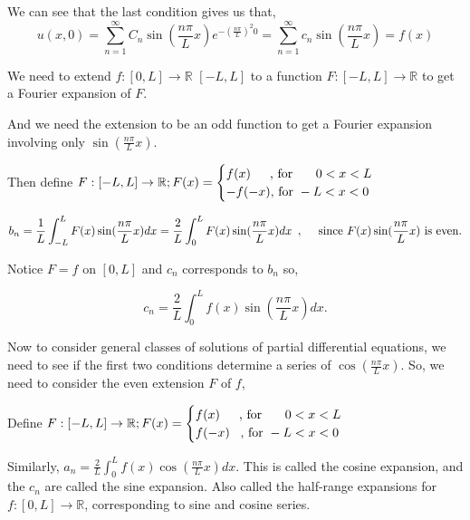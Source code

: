 \documentclass{article}
\newcommand\R{\mathbb{R}}
\begin{document}
We can see that the last condition gives us that,
$$u(x,0) = \sum_{n=1}^\infty C_n
\sin(\frac{n\pi}{L}x)e^{-(\frac{n\pi}{L})^2 0} = \sum_{n=1}^\infty c_n
\sin(\frac{n\pi}{L}x) = f(x)$$

We need to extend $f:[0,L]\rightarrow \R$
$[-L,L]$ to a function $F:[-L,L]\rightarrow \R$ to get a Fourier expansion of $F$.

And we need the extension to be an odd function to get a Fourier expansion involving only
$\sin(\frac{n\pi}{L}x)$.

Then define $F:[-L,L]\rightarrow \R; F(x) = \begin{cases} f(x)\quad\enskip \text{, for
  }\quad\enskip 0<x<L\\ -f(-x)\text{, for }-L<x<0\end{cases}$

$$b_n = \frac{1}{L}\int_{-L}^L F(x)\sin(\frac{n\pi}{L}x)dx =
\frac{2}{L}\int_{0}^LF(x)\sin(\frac{n\pi}{L}x)dx\enskip,\quad \text{ since
}F(x)\sin(\frac{n\pi}{L}x)\text{ is even.}$$

Notice $F = f$ on $[0,L]$ and $c_n$ corresponds to $b_n$ so,

$$c_n = \frac{2}{L} \int_0^L f(x) \sin(\frac{n\pi}{L}x) dx.$$


Now to consider general classes of solutions of partial differential
equations, we need to see if the first two conditions determine a
series of $\cos(\frac{n\pi}{L}x)$. So, we need to consider the even
extension $F$ of $f$,

Define $F:[-L,L]\rightarrow \R; F(x) = \begin{cases} f(x)\quad\enskip \text{, for
  }\quad\enskip 0<x<L\\f(-x)\enskip\text{ , for }-L<x<0\end{cases}$

Similarly, $a_n = \frac{2}{L} \int_{0}^L f(x)\cos(\frac{n\pi}{L}x)dx.$
This is called the cosine expansion, and the $c_n$ are called the sine
expansion. Also called the half-range expansions for
$f:[0,L]\rightarrow \R$, corresponding to sine and cosine series.
\end{document}
